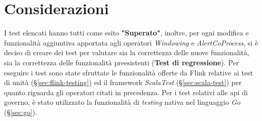 \section{Considerazioni}
I test elencati hanno tutti come esito \textbf{"Superato"}, inoltre, per ogni modifica e funzionalità aggiuntiva apportata agli operatori \textit{Windowing} e \textit{AlertCoProcess}, si è deciso di creare dei test per valutare sia la correttezza delle nuove funzionalità, sia la correttezza delle funzionalità preesistenti (\textbf{Test di regressione}). Per eseguire i test sono state sfruttate le funzionalità offerte da Flink relative ai test di unità (\S\ref{sec:flink-testing}) ed il \gls{framework} \textit{ScalaTest} (\S\ref{sec:scala-test}) per quanto riguarda gli operatori citati in precedenza. Per i test relativi alle \gls{api} di governo, è stato utilizzato la funzionalità di \textit{testing} nativa nel linguaggio \textit{Go} (\S\ref{sec:go}).